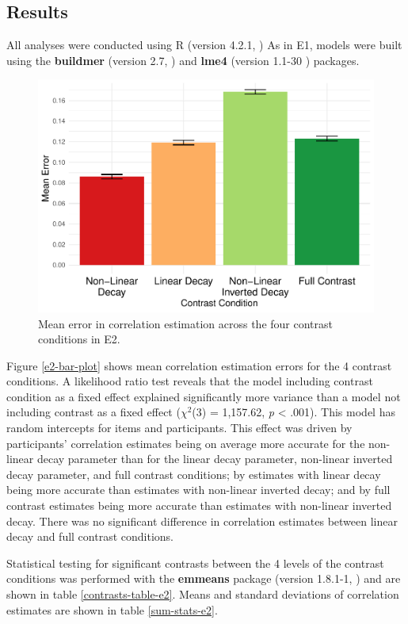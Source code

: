 \documentclass[preprint, 3p,
authoryear]{elsarticle} %
\begin{document}
\hypertarget{results-1}{%
\subsection{Results}\label{results-1}}

All analyses were conducted using R (version 4.2.1, \citep{r_core}) As
in E1, models were built using the \textbf{buildmer} (version 2.7,
\citep{voeten_buildmer_2022}) and \textbf{lme4} (version 1.1-30
\citep{bates_lme4_2015}) packages.

\begin{figure}

\includegraphics[width=0.5\linewidth]{contrast_and_scatterplots_files/figure-latex/e2-bar-plot-1} \hfill{}

\caption{\label{e2-bar-plot}Mean error in correlation estimation across the four contrast conditions in E2.}\label{fig:e2-bar-plot}
\end{figure}

Figure \ref{e2-bar-plot} shows mean correlation estimation errors for
the 4 contrast conditions. A likelihood ratio test reveals that the
model including contrast condition as a fixed effect explained
significantly more variance than a model not including contrast as a
fixed effect (\(\chi^2\)(3) = 1,157.62, \emph{p} \textless{} .001). This
model has random intercepts for items and participants. This effect was
driven by participants' correlation estimates being on average more
accurate for the non-linear decay parameter than for the linear decay
parameter, non-linear inverted decay parameter, and full contrast
conditions; by estimates with linear decay being more accurate than
estimates with non-linear inverted decay; and by full contrast estimates
being more accurate than estimates with non-linear inverted decay. There
was no significant difference in correlation estimates between linear
decay and full contrast conditions.

Statistical testing for significant contrasts between the 4 levels of
the contrast conditions was performed with the \textbf{emmeans} package
(version 1.8.1-1, \citep{emmeans}) and are shown in table
\ref{contrasts-table-e2}. Means and standard deviations of correlation
estimates are shown in table \ref{sum-stats-e2}.
\end{document}

